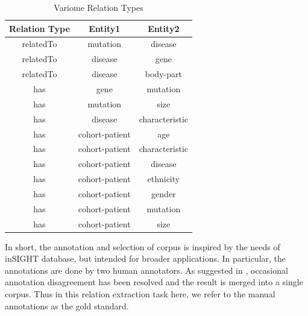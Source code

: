 \begin{table}
	\caption{Variome Relation Types}
	\centering
	\label{table:Variome_Relations}
	\begin{tabular}{|c | c |c  |}
		\hline 
		{Relation Type} 
		& Entity1 & Entity2\\ 
		\hline
		relatedTo  & mutation & disease \\
		relatedTo & disease & gene\\
		relatedTo & disease & body-part\\
		\hline 
		has     & gene & mutation\\
		has     & mutation & size\\
		has     & disease & characteristic\\
		has     & cohort-patient & age\\
		has     & cohort-patient & characteristic\\
		has     & cohort-patient & disease\\
		has     & cohort-patient & ethnicity\\
		has     & cohort-patient & gender\\
		has     & cohort-patient & mutation\\
		has     & cohort-patient & size \\
		\hline 
	\end{tabular}
\end{table}
In short, the annotation and selection of corpus is inspired by the needs of inSIGHT database, but intended for broader applications. In particular, the annotations are done by two human annotators. As suggested in \cite{verspoor2013annotating}, occasional annotation disagreement has been resolved and the result is merged into a single corpus. Thus in this relation extraction task here, we refer to the manual annotations as the gold standard. 
